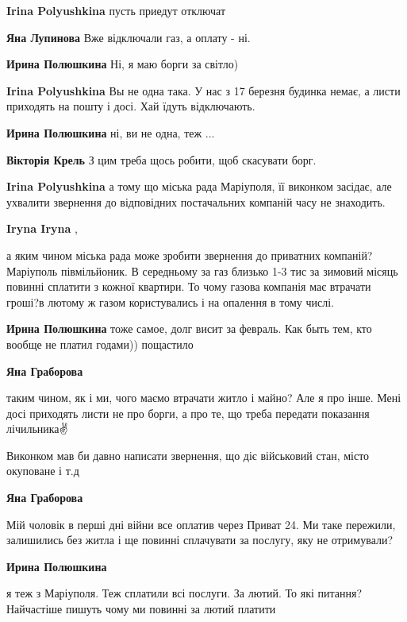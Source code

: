 \begin{itemize} %
\textbf{Irina Polyushkina} пусть приедут отключат

\textbf{Яна Лупинова} Вже відключали газ, а оплату - ні.

\textbf{Ирина Полюшкина} Ні, я маю борги за світло)

\textbf{Irina Polyushkina} Вы не одна така. У нас з 17 березня будинка немає, а листи приходять на пошту і досі. Хай їдуть відключають.

\textbf{Ирина Полюшкина} ні, ви не одна, теж ...

\textbf{Вікторія Крель} З цим треба щось робити, щоб скасувати борг.

\textbf{Irina Polyushkina} а тому що міська рада Маріуполя, її виконком засідає, але ухвалити звернення до відповідних постачальних компаній часу не знаходить.

\textbf{Iryna Iryna} , 

а яким чином міська рада може зробити звернення до приватних компаній?
Маріуполь півмільйоник. В середньому за газ близько 1-3 тис за зимовий місяць
повинні сплатити з кожної квартири. То чому газова компанія має втрачати
гроші?в лютому ж газом користувались і на опалення в тому числі.

\textbf{Ирина Полюшкина} тоже самое, долг висит за февраль. Как быть тем, кто вообще не платил годами)) пощастило

\textbf{Яна Граборова} 

таким чином, як і ми, чого маємо втрачати житло і майно? Але я про інше. Мені
досі приходять листи не про борги, а про те, що треба передати показання
лічильника✌️

Виконком мав би давно написати звернення, що діє військовий стан, місто
окуповане і т.д

\textbf{Яна Граборова} 

Мій чоловік в перші дні війни все оплатив через Приват 24. Ми таке пережили,
залишились без житла і ще повинні сплачувати за послугу, яку не отримували?

\textbf{Ирина Полюшкина} 

я теж з Маріуполя. Теж сплатили всі послуги. За лютий. То які питання?
Найчастіше пишуть чому ми повинні за лютий платити


\end{itemize}
